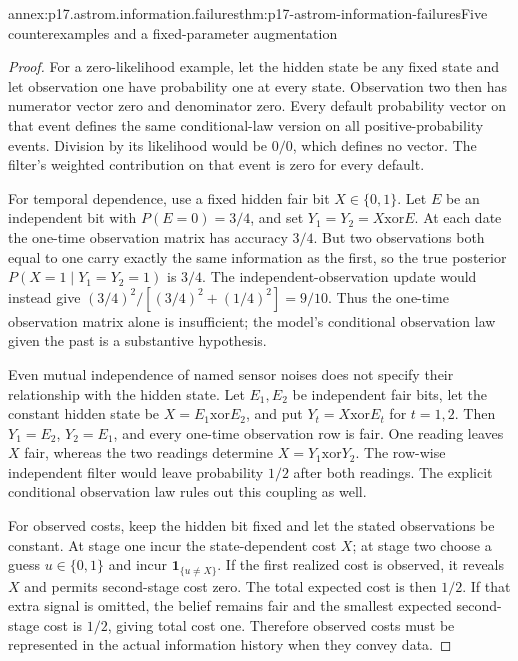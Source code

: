 \begin{annexitem}{annex:p17.astrom.information.failures}{thm:p17-astrom-information-failures}{Five counterexamples and a fixed-parameter augmentation}
\begin{proof}
For a zero-likelihood example, let the hidden state
be any fixed state and let observation one have
probability one at every state. Observation two
then has numerator vector zero and denominator zero.
Every default probability vector on that event
defines the same conditional-law version on all
positive-probability events. Division by its
likelihood would be \(0/0\), which defines no vector.
The filter's weighted contribution on that event
is zero for every default.

For temporal dependence, use a fixed hidden fair bit
\(X\in\{0,1\}\). Let \(E\) be an independent bit with
\(P(E=0)=3/4\), and set \(Y_1=Y_2=X\mathbin{\mathrm{xor}}E\).
At each date the one-time observation matrix has
accuracy \(3/4\). But two observations both equal to
one carry exactly the same information as the first,
so the true posterior \(P(X=1\mid Y_1=Y_2=1)\) is
\(3/4\). The independent-observation update would
instead give
\((3/4)^2/[(3/4)^2+(1/4)^2]=9/10\).
Thus the one-time observation matrix alone is
insufficient; the model's conditional observation
law given the past is a substantive hypothesis.

Even mutual independence of named sensor noises does
not specify their relationship with the hidden state.
Let \(E_1,E_2\) be independent fair bits, let the
constant hidden state be \(X=E_1\mathbin{\mathrm{xor}}E_2\),
and put \(Y_t=X\mathbin{\mathrm{xor}}E_t\) for \(t=1,2\).
Then \(Y_1=E_2\), \(Y_2=E_1\), and every one-time
observation row is fair. One reading leaves \(X\)
fair, whereas the two readings determine
\(X=Y_1\mathbin{\mathrm{xor}}Y_2\).
The row-wise independent filter would leave probability
\(1/2\) after both readings. The explicit conditional
observation law rules out this coupling as well.

For observed costs, keep the hidden bit fixed and
let the stated observations be constant.
At stage one incur the state-dependent cost \(X\);
at stage two choose a guess \(u\in\{0,1\}\) and
incur \(\mathbf1_{\{u\ne X\}}\).
If the first realized cost is observed, it reveals
\(X\) and permits second-stage cost zero.
The total expected cost is then \(1/2\).
If that extra signal is omitted, the belief remains
fair and the smallest expected second-stage cost is
\(1/2\), giving total cost one.
Therefore observed costs must be represented in the
actual information history when they convey data.


\end{proof}
\end{annexitem}
